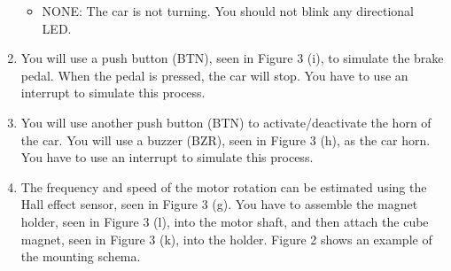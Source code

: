 \begin{enumerate}
\begin{itemize}
        \item NONE: The car is not turning. You should not blink any directional LED.
    \end{itemize}
    \item You will use a push button (BTN), seen in Figure 3 (i), to simulate the brake pedal. When the pedal is pressed, the car will stop. You have to use an interrupt to simulate this process.
    \item You will use another push button (BTN) to activate/deactivate the horn of the car. You will use a buzzer (BZR), seen in Figure 3 (h), as the car horn. You have to use an interrupt to simulate this process.
    \item The frequency and speed of the motor rotation can be estimated using the Hall effect sensor, seen in Figure 3 (g). You have to assemble the magnet holder, seen in Figure 3 (l), into the motor shaft, and then attach the cube magnet, seen in Figure 3 (k), into the holder. Figure 2 shows an example of the mounting schema.
\end{enumerate}
